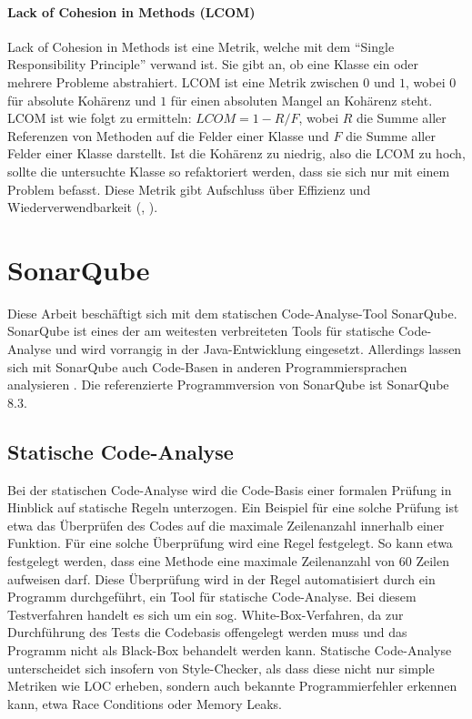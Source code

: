 \documentclass[a4paper, 12pt]{article}
\begin{document}
\paragraph{Lack of Cohesion in Methods (LCOM)}
Lack of Cohesion in Methods ist eine Metrik, welche mit dem \enquote{Single Responsibility Principle} verwand ist.
Sie gibt an, ob eine Klasse ein oder mehrere Probleme abstrahiert.
LCOM ist eine Metrik zwischen $0$ und $1$, wobei $0$ für absolute Kohärenz und $1$ für einen absoluten Mangel an Kohärenz steht.
LCOM ist wie folgt zu ermitteln:  $LCOM = 1 - R / F$, wobei $R$ die Summe aller Referenzen von Methoden auf die Felder einer Klasse und $F$ die Summe aller Felder einer Klasse darstellt.
Ist die Kohärenz zu niedrig, also die LCOM zu hoch, sollte die untersuchte Klasse so refaktoriert werden, dass sie sich nur mit einem Problem befasst.
Diese Metrik gibt Aufschluss über Effizienz und Wiederverwendbarkeit (\textcite{Metrics_OO_design}, \textcite{Linda_softwarequality}).

\section{SonarQube}

Diese Arbeit beschäftigt sich mit dem statischen Code-Analyse-Tool SonarQube.
SonarQube ist eines der am weitesten verbreiteten Tools für statische Code-Analyse und wird vorrangig in der Java-Entwicklung eingesetzt.
Allerdings lassen sich mit SonarQube auch Code-Basen in anderen Programmiersprachen analysieren \parencite{sonarqube_languages}.
Die referenzierte Programmversion von SonarQube ist SonarQube 8.3.

\subsection{Statische Code-Analyse}
Bei der statischen Code-Analyse wird die Code-Basis einer formalen Prüfung in Hinblick auf statische Regeln unterzogen.
Ein Beispiel für eine solche Prüfung ist etwa das Überprüfen des Codes auf die maximale Zeilenanzahl innerhalb einer Funktion.
Für eine solche Überprüfung wird eine Regel festgelegt.
So kann etwa festgelegt werden, dass eine Methode eine maximale Zeilenanzahl von 60 Zeilen aufweisen darf.
Diese Überprüfung wird in der Regel automatisiert durch ein Programm durchgeführt, ein Tool für statische Code-Analyse.
Bei diesem Testverfahren handelt es sich um ein sog. White-Box-Verfahren, da zur Durchführung des Tests die Codebasis offengelegt werden muss und das Programm nicht als Black-Box behandelt werden kann.
Statische Code-Analyse unterscheidet sich insofern von Style-Checker, als dass diese nicht nur simple Metriken wie LOC erheben, sondern auch bekannte Programmierfehler erkennen kann, etwa Race Conditions oder Memory Leaks.
\end{document}
